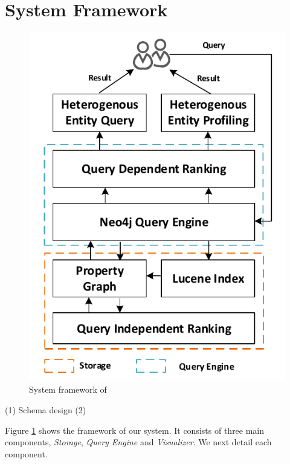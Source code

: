 \section{System Framework}
\label{sec-system}

\begin{figure}
\centering
\includegraphics[width=0.5\columnwidth]{systemFrame.pdf}
\caption{System framework of \oursystem}
\label{fig:frame}
\vspace{-2ex}
\end{figure}

(1) Schema design
(2)


Figure \ref{fig:frame} shows the framework of our \oursystem system. It consists of three main components, \emph{Storage}, \emph{Query Engine} and \emph{Visualizer}. We next detail each component.





